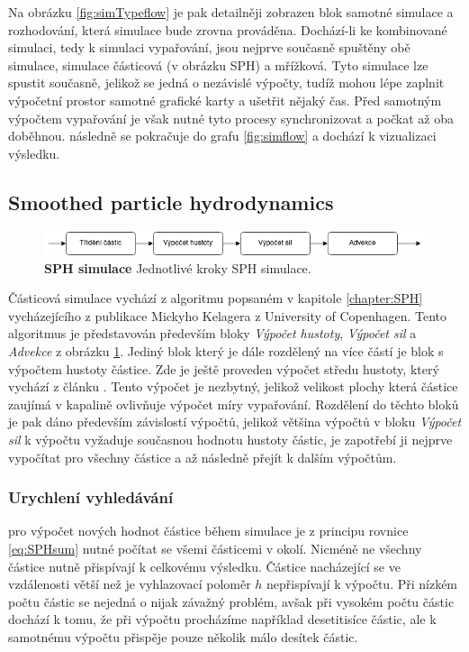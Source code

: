 Na obrázku \ref{fig:simTypeflow} je pak detailněji zobrazen blok samotné simulace a rozhodování, která simulace bude zrovna prováděna. Dochází-li ke kombinované simulaci, tedy k simulaci vypařování, jsou nejprve současně spuštěny obě simulace, simulace částicová (v obrázku SPH) a mřížková. Tyto simulace lze spustit současně, jelikož se jedná o nezávislé výpočty, tudíž mohou lépe zaplnit výpočetní prostor samotné grafické karty a ušetřit nějaký čas. Před samotným výpočtem vypařování je však nutné tyto procesy synchronizovat a počkat až oba doběhnou. následně se pokračuje do grafu \ref{fig:simflow} a dochází k vizualizaci výsledku.



\subsection{Smoothed particle hydrodynamics}
\label{chapter:simSPH}

\begin{figure}[hbt]
	\centering
	\captionsetup{justification=centering}
	\includegraphics[scale=0.6]{obrazky-figures/SPH.png}
	\caption{\textbf{SPH simulace} Jednotlivé kroky SPH simulace.}
	\label{fig:SPHflow}
\end{figure}

Částicová simulace vychází z algoritmu popsaném v kapitole \ref{chapter:SPH} vycházejícího z publikace \cite{KelagerSPH} Mickyho Kelagera z University of Copenhagen. Tento algoritmus je představován především bloky \textit{Výpočet hustoty}, \textit{Výpočet sil} a \textit{Advekce} z obrázku \ref{fig:SPHflow}. Jediný blok který je dále rozdělený na více částí je blok s výpočtem hustoty částice. Zde je ještě proveden výpočet středu hustoty, který vychází z článku \cite{sufaceSPH}. Tento výpočet je nezbytný, jelikož velikost plochy která částice zaujímá v kapalině ovlivňuje výpočet míry vypařování. Rozdělení do těchto bloků je pak dáno především závislostí výpočtů, jelikož většina výpočtů v bloku \textit{Výpočet sil} k výpočtu vyžaduje současnou hodnotu hustoty částic, je zapotřebí ji nejprve vypočítat pro všechny částice a až následně přejít k dalším výpočtům.

\subsubsection{Urychlení vyhledávání}
pro výpočet nových hodnot částice během simulace je z principu rovnice \ref{eq:SPHsum} nutné počítat se všemi částicemi v okolí. Nicméně ne všechny částice nutně přispívají k celkovému výsledku. Částice nacházející se ve vzdálenosti větší než je vyhlazovací poloměr $h$ nepřispívají k výpočtu. Při nízkém počtu částic se nejedná o nijak závažný problém, avšak při vysokém počtu částic dochází k tomu, že při výpočtu procházíme například desetitisíce částic, ale k samotnému výpočtu přispěje pouze několik málo desítek částic. 

